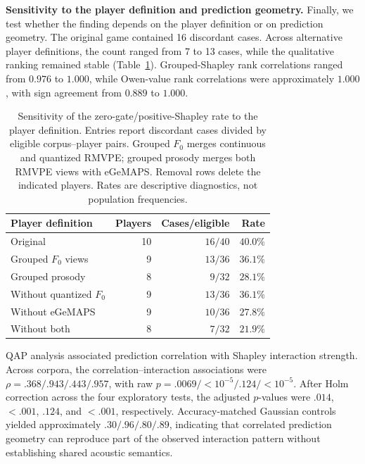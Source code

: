 \documentclass{article}
\begin{document}
\textbf{Sensitivity to the player definition and prediction geometry.}
Finally, we test whether the finding depends on the player definition or on
prediction geometry. The original game contained 16 discordant cases. Across alternative player
definitions, the count ranged from 7 to 13 cases, while the qualitative
ranking remained stable (Table~\ref{tab:player_sensitivity}). Grouped-Shapley
rank correlations ranged from $0.976$ to $1.000$, while Owen-value rank
correlations were approximately $1.000$, with sign agreement from $0.889$ to
$1.000$.

\begin{table}[t]
\centering
\small
\caption{Sensitivity of the zero-gate/positive-Shapley rate to the player
definition. Entries report discordant cases divided by eligible
corpus--player pairs. Grouped $F_0$ merges continuous and quantized RMVPE;
grouped prosody merges both RMVPE views with eGeMAPS. Removal rows delete the
indicated players. Rates are descriptive diagnostics, not population
frequencies.}
\label{tab:player_sensitivity}
\setlength{\tabcolsep}{3.0pt}
\begin{tabular}{lrrr}
\toprule
Player definition & Players & Cases/eligible & Rate \\
\midrule
Original                & 10 & $16/40$ & $40.0\%$ \\
Grouped $F_0$ views     & 9  & $13/36$ & $36.1\%$ \\
Grouped prosody         & 8  & $9/32$  & $28.1\%$ \\
Without quantized $F_0$ & 9  & $13/36$ & $36.1\%$ \\
Without eGeMAPS         & 9  & $10/36$ & $27.8\%$ \\
Without both            & 8  & $7/32$  & $21.9\%$ \\
\bottomrule
\end{tabular}
\end{table}

QAP analysis associated prediction correlation with Shapley interaction
strength. Across corpora, the correlation--interaction associations were
$\rho=.368/.943/.443/.957$, with raw
$p=.0069/<10^{-5}/.124/<10^{-5}$. After Holm correction across the four
exploratory tests, the adjusted $p$-values were $.014$, $<.001$, $.124$, and
$<.001$, respectively. Accuracy-matched Gaussian controls yielded
approximately $.30/.96/.80/.89$, indicating that correlated prediction
geometry can reproduce part of the observed interaction pattern without
establishing shared acoustic semantics.
\end{document}
